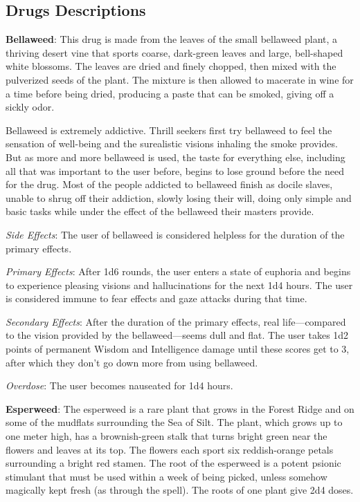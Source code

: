 \subsection{Drugs Descriptions}

\textbf{Bellaweed}: This drug is made from the leaves of the small bellaweed plant, a thriving desert vine that sports coarse, dark-green leaves and large, bell-shaped white blossoms. The leaves are dried and finely chopped, then mixed with the pulverized seeds of the plant. The mixture is then allowed to macerate in wine for a time before being dried, producing a paste that can be smoked, giving off a sickly odor.

Bellaweed is extremely addictive. Thrill seekers first try bellaweed to feel the sensation of well-being and the surealistic visions inhaling the smoke provides. But as more and more bellaweed is used, the taste for everything else, including all that was important to the user before, begins to lose ground before the need for the drug. Most of the people addicted to bellaweed finish as docile slaves, unable to shrug off their addiction, slowly losing their will, doing only simple and basic tasks while under the effect of the bellaweed their masters provide.

\textit{Side Effects}: The user of bellaweed is considered helpless for the duration of the primary effects.

\textit{Primary Effects}: After 1d6 rounds, the user enters a state of euphoria and begins to experience pleasing visions and hallucinations for the next 1d4 hours. The user is considered immune to fear effects and gaze attacks during that time.

\textit{Secondary Effects}: After the duration of the primary effects, real life---compared to the vision provided by the bellaweed---seems dull and flat. The user takes 1d2 points of permanent Wisdom and Intelligence damage until these scores get to 3, after which they don't go down more from using bellaweed.

\textit{Overdose}: The user becomes nauseated for 1d4 hours.

\textbf{Esperweed}: The esperweed is a rare plant that grows in the Forest Ridge and on some of the mudflats surrounding the Sea of Silt. The plant, which grows up to one meter high, has a brownish-green stalk that turns bright green near the flowers and leaves at its top. The flowers each sport six reddish-orange petals surrounding a bright red stamen. The root of the esperweed is a potent psionic stimulant that must be used within a week of being picked, unless somehow magically kept fresh (as through the  spell). The roots of one plant give 2d4 doses.

